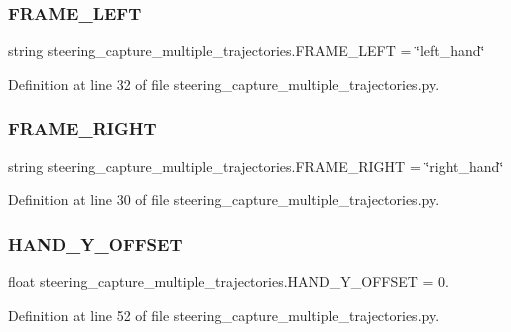 \subsubsection{\texorpdfstring{FRAME\_LEFT}{FRAME\_LEFT}}
{\footnotesize\ttfamily string steering\+\_\+capture\+\_\+multiple\+\_\+trajectories.\+F\+R\+A\+M\+E\+\_\+\+L\+E\+FT = \char`\"{}left\+\_\+hand\char`\"{}}



Definition at line 32 of file steering\+\_\+capture\+\_\+multiple\+\_\+trajectories.\+py.

\mbox{\label{namespacesteering__capture__multiple__trajectories_a3bfc9a7fa847955d6d833a7745063fe5}} 
\subsubsection{\texorpdfstring{FRAME\_RIGHT}{FRAME\_RIGHT}}
{\footnotesize\ttfamily string steering\+\_\+capture\+\_\+multiple\+\_\+trajectories.\+F\+R\+A\+M\+E\+\_\+\+R\+I\+G\+HT = \char`\"{}right\+\_\+hand\char`\"{}}



Definition at line 30 of file steering\+\_\+capture\+\_\+multiple\+\_\+trajectories.\+py.

\mbox{\label{namespacesteering__capture__multiple__trajectories_a3933eb9e16f7a32da3622a7bc4bac011}} 
\subsubsection{\texorpdfstring{HAND\_Y\_OFFSET}{HAND\_Y\_OFFSET}}
{\footnotesize\ttfamily float steering\+\_\+capture\+\_\+multiple\+\_\+trajectories.\+H\+A\+N\+D\+\_\+\+Y\+\_\+\+O\+F\+F\+S\+ET = 0.}



Definition at line 52 of file steering\+\_\+capture\+\_\+multiple\+\_\+trajectories.\+py.

